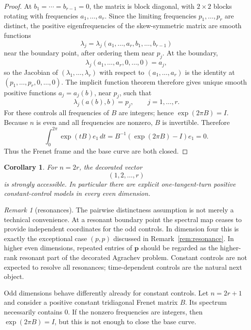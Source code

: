 \documentclass[11pt,reqno]{amsart}
\newtheorem{corollary}[theorem]{Corollary}
\theoremstyle{definition}
\theoremstyle{remark}
\newtheorem{remark}[theorem]{Remark}
\begin{document}
\begin{proof}
At $b_1=\cdots=b_{r-1}=0$, the matrix is block diagonal, with $2\times2$ blocks
rotating with frequencies $a_1,\ldots,a_r$.  Since the limiting frequencies
$p_1,\ldots,p_r$ are distinct, the positive eigenfrequencies of the skew-symmetric
matrix are smooth functions
\[
        \lambda_j=\lambda_j(a_1,\ldots,a_r,b_1,\ldots,b_{r-1})
\]
near the boundary point, after ordering them near $p_j$.  At the boundary,
\[
        \lambda_j(a_1,\ldots,a_r,0,\ldots,0)=a_j,
\]
so the Jacobian of $(\lambda_1,\ldots,\lambda_r)$ with respect to
$(a_1,\ldots,a_r)$ is the identity at $(p_1,\ldots,p_r,0,\ldots,0)$.  The implicit
function theorem therefore gives unique smooth positive functions $a_j=a_j(b)$,
near $p_j$, such that
\[
        \lambda_j(a(b),b)=p_j,
        \qquad j=1,\ldots,r.
\]
For these controls all frequencies of $B$ are integers; hence $\exp(2\pi B)=I$.
Because $n$ is even and all frequencies are nonzero, $B$ is invertible.  Therefore
\[
        \int_0^{2\pi}\exp(tB)e_1\,dt
        =B^{-1}(\exp(2\pi B)-I)e_1=0.
\]
Thus the Frenet frame and the base curve are both closed.
\end{proof}

\begin{corollary}\label{cor:even-one-turn}
For $n=2r$, the decorated vector
\[
        (1,2,\ldots,r)
\]
is strongly accessible.  In particular there are explicit one-tangent-turn positive
constant-control models in every even dimension.
\end{corollary}

\begin{remark}[resonances]\label{rem:higher-resonances}
The pairwise distinctness assumption is not merely a technical convenience.  At a
resonant boundary point the spectral map ceases to provide independent coordinates
for the odd controls.  In dimension four this is exactly the exceptional case
$(p,p)$ discussed in Remark~\ref{rem:resonance}.  In higher even dimensions, repeated
entries of $\mathbf p$ should be regarded as the higher-rank resonant part of the
decorated Agrachev problem.  Constant controls are not expected to resolve all
resonances; time-dependent controls are the natural next object.
\end{remark}

Odd dimensions behave differently already for constant controls.  Let $n=2r+1$ and
consider a positive constant tridiagonal Frenet matrix $B$.  Its spectrum necessarily
contains $0$.  If the nonzero frequencies are integers, then $\exp(2\pi B)=I$, but
this is not enough to close the base curve.
\end{document}
